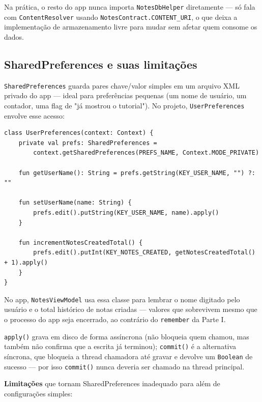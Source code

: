 \documentclass[11pt,a4paper]{article}
\begin{document}
Na prática, o resto do app nunca importa \texttt{NotesDbHelper}
diretamente — só fala com \texttt{ContentResolver} usando
\texttt{NotesContract.CONTENT\_URI}, o que deixa a implementação de
armazenamento livre para mudar sem afetar quem consome os dados.

\subsection{SharedPreferences e suas limitações}
\label{sec:sharedpreferences}

\texttt{SharedPreferences} guarda pares chave/valor simples em um
arquivo XML privado do app — ideal para preferências pequenas (um nome de
usuário, um contador, uma flag de "já mostrou o tutorial"). No projeto,
\texttt{UserPreferences} envolve esse acesso:

\begin{lstlisting}[caption={UserPreferences: leitura/escrita simples com apply()}, label=lst:sharedprefs]
class UserPreferences(context: Context) {
    private val prefs: SharedPreferences =
        context.getSharedPreferences(PREFS_NAME, Context.MODE_PRIVATE)

    fun getUserName(): String = prefs.getString(KEY_USER_NAME, "") ?: ""

    fun setUserName(name: String) {
        prefs.edit().putString(KEY_USER_NAME, name).apply()
    }

    fun incrementNotesCreatedTotal() {
        prefs.edit().putInt(KEY_NOTES_CREATED, getNotesCreatedTotal() + 1).apply()
    }
}
\end{lstlisting}

No app, \texttt{NotesViewModel} usa essa classe para lembrar o nome
digitado pelo usuário e o total histórico de notas criadas — valores que
sobrevivem mesmo que o processo do app seja encerrado, ao contrário do
\texttt{remember} da Parte I.

\texttt{apply()} grava em disco de forma assíncrona (não bloqueia quem
chamou, mas também não confirma que a escrita já terminou);
\texttt{commit()} é a alternativa síncrona, que bloqueia a thread
chamadora até gravar e devolve um \texttt{Boolean} de sucesso — por isso
\texttt{commit()} nunca deveria ser chamado na thread principal.

\textbf{Limitações} que tornam SharedPreferences inadequado para além de
configurações simples:
\end{document}
